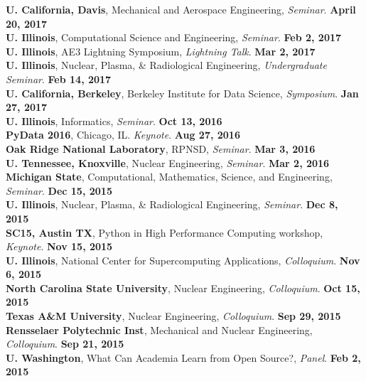 \documentclass[margin,line]{resume}
\begin{document}
\begin{resume}
      \textbf{U. California, Davis}, Mechanical and Aerospace Engineering, \emph{Seminar}.  \hfill\textbf{April 20, 2017}\\
      \textbf{U. Illinois}, Computational Science and Engineering, \emph{Seminar}.  \hfill\textbf{Feb 2, 2017}\\
      \textbf{U. Illinois}, AE3 Lightning Symposium, \emph{Lightning Talk}.  \hfill\textbf{Mar 2, 2017}\\
      \textbf{U. Illinois}, Nuclear, Plasma, \& Radiological Engineering, \emph{Undergraduate Seminar}.  \hfill\textbf{Feb 14, 2017}\\
      \textbf{U. California, Berkeley}, Berkeley Institute for Data Science, \emph{Symposium}.  \hfill\textbf{Jan 27, 2017}\\
      \textbf{U. Illinois}, Informatics, \emph{Seminar}.  \hfill\textbf{Oct 13, 2016}\\
      \textbf{PyData 2016}, Chicago, IL. \emph{Keynote}.  \hfill\textbf{Aug 27, 2016}\\
      \textbf{Oak Ridge National Laboratory}, RPNSD, \emph{Seminar}.  \hfill\textbf{Mar 3, 2016}\\
      \textbf{U. Tennessee, Knoxville}, Nuclear Engineering, \emph{Seminar}.  \hfill\textbf{Mar 2, 2016}\\
      \textbf{Michigan State}, Computational, Mathematics, Science, and Engineering, \emph{Seminar}.  \hfill\textbf{Dec 15, 2015}\\
      \textbf{U. Illinois}, Nuclear, Plasma, \& Radiological Engineering, \emph{Seminar}.          \hfill\textbf{Dec 8, 2015}\\
      \textbf{SC15, Austin TX}, Python in High Performance Computing workshop, \emph{Keynote}.     \hfill\textbf{Nov 15, 2015}\\
      \textbf{U. Illinois}, National Center for Supercomputing Applications, \emph{Colloquium}.    \hfill\textbf{Nov 6, 2015}\\
      \textbf{North Carolina State University}, Nuclear Engineering, \emph{Colloquium}.            \hfill\textbf{Oct 15, 2015}\\
      \textbf{Texas A\&M University}, Nuclear Engineering, \emph{Colloquium}.                      \hfill\textbf{ Sep 29, 2015}\\
      \textbf{Rensselaer Polytechnic Inst}, Mechanical and Nuclear Engineering, \emph{Colloquium}. \hfill\textbf{Sep 21, 2015}\\
      \textbf{U. Washington}, What Can Academia Learn from Open Source?, \emph{Panel}.   \hfill\textbf{Feb 2, 2015}


\end{resume}
\end{document}
